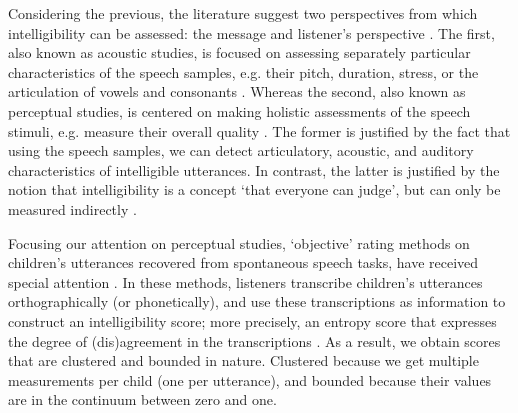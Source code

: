 Considering the previous, the literature suggest two perspectives from which intelligibility can be assessed: the message and listener’s perspective \cite{Boonen_et_al_2020, Boonen_et_al_2021}. The first, also known as acoustic studies, is focused on assessing separately particular characteristics of the speech samples, e.g. their pitch, duration, stress, or the articulation of vowels and consonants \cite{Rowe_et_al_2018}. Whereas the second, also known as perceptual studies, is centered on making holistic assessments of the speech stimuli, e.g. measure their overall quality \cite{Boonen_et_al_2020, Boonen_et_al_2021}. The former is justified by the fact that using the speech samples, we can detect articulatory, acoustic, and auditory characteristics of intelligible utterances. In contrast, the latter is justified by the notion that intelligibility is a concept `that everyone can judge', but can only be measured indirectly \cite{Guilford_1954, Stevens_1946}.

\begin{comment}
	
	On both instances, the stimuli (children's utterances) can be generated from reading at loud, contextualized utterances, or spontaneous speech tasks\footnote{ordered on increasing level of ecological validity \cite{Flipsen_2006, Ertmer_2011}}.
	
	Based on their description, it seems that perceptual are more subjective than acoustic studies, as they do not rely on "objective" measurements, i.e. time duration, wave amplitude, among others, available in the former. However, for the case of SI, there are objective and subjective assessment methodologies.
		
\end{comment}

Focusing our attention on perceptual studies, `objective' rating methods on children's utterances recovered from spontaneous speech tasks, have received special attention \cite{Boonen_et_al_2021, Hustad_et_al_2020}. In these methods, listeners transcribe children's utterances orthographically (or phonetically), and use these transcriptions as information to construct an intelligibility score; more precisely, an entropy score that expresses the degree of (dis)agreement in the transcriptions \cite{Boonen_et_al_2021, Shannon_1948}. As a result, we obtain scores that are clustered and bounded in nature. Clustered because we get multiple measurements per child (one per utterance), and bounded because their values are in the continuum between zero and one.


